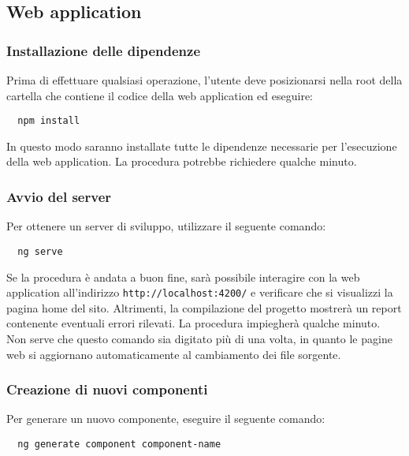 \documentclass[../../manuale-manutentore.tex]{subfiles}
\begin{document}
\subsection{Web application}%
\label{sub:web_application}

\subsubsection{Installazione delle dipendenze}%
\label{subs:installazione_delle_dipendenze}

Prima di effettuare qualsiasi operazione, l'utente deve posizionarsi nella root della cartella che contiene il codice della web application ed eseguire:

\begin{verbatim}
  npm install
\end{verbatim}

In questo modo saranno installate tutte le dipendenze necessarie per l'esecuzione della web application.
La procedura potrebbe richiedere qualche minuto.

\subsubsection{Avvio del server}%
\label{subs:avvio_del_server}

Per ottenere un server di sviluppo, utilizzare il seguente comando:

\begin{verbatim}
  ng serve
\end{verbatim}

Se la procedura è andata a buon fine, sarà possibile interagire con la web application all'indirizzo \texttt{http://localhost:4200/} e verificare che si visualizzi la pagina home del sito.
Altrimenti, la compilazione del progetto mostrerà un report contenente eventuali errori rilevati.
La procedura impiegherà qualche minuto.
Non serve che questo comando sia digitato più di una volta, in quanto le pagine web si aggiornano automaticamente al cambiamento dei file sorgente.

\subsubsection{Creazione di nuovi componenti}%
\label{subs:creazione_dei_nuovi_componenti}

Per generare un nuovo componente, eseguire il seguente comando:

\begin{verbatim}
  ng generate component component-name
\end{verbatim}
\end{document}
